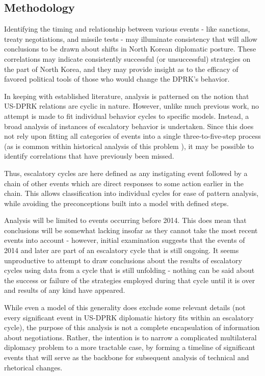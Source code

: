 \documentclass{article}
\begin{document}
\subsection{Methodology}

Identifying the timing and relationship between various events - like sanctions, treaty negotiations, and missile tests - may illuminate consistency that will allow conclusions to be drawn about shifts in North Korean diplomatic posture. These correlations may indicate consistently successful (or unsuccessful) strategies on the part of North Korea, and they may provide insight as to the efficacy of favored political tools of those who would change the DPRK's behavior.

In keeping with established literature, analysis is patterned on the notion that US-DPRK relations are cyclic in nature. However, unlike much previous work, no attempt is made to fit individual behavior cycles to specific models. Instead, a broad analysis of instances of escalatory behavior is undertaken. Since this does not rely upon fitting all categories of events into a single three-to-five-step process (as is common within historical analysis of this problem \cite{fisher, jun}), it may be possible to identify correlations that have previously been missed.

Thus, escalatory cycles are here defined as any instigating event followed by a chain of other events which are direct responses to some action earlier in the chain. This allows classification into individual cycles for ease of pattern analysis, while avoiding the preconceptions built into a model with defined steps.

Analysis will be limited to events occurring before 2014. This does mean that conclusions will be somewhat lacking insofar as they cannot take the most recent events into account - however, initial examination suggests that the events of 2014 and later are part of an escalatory cycle that is still ongoing. It seems unproductive to attempt to draw conclusions about the results of escalatory cycles using data from a cycle that is still unfolding - nothing can be said about the success or failure of the strategies employed during that cycle until it is over and results of any kind have appeared.

While even a model of this generality does exclude some relevant details (not every significant event in US-DPRK diplomatic history fits within an escalatory cycle), the purpose of this analysis is not a complete encapsulation of information about negotiations. Rather, the intention is to narrow a complicated multilateral diplomacy problem to a more tractable case, by forming a timeline of significant events that will serve as the backbone for subsequent analysis of technical and rhetorical changes.
\end{document}
